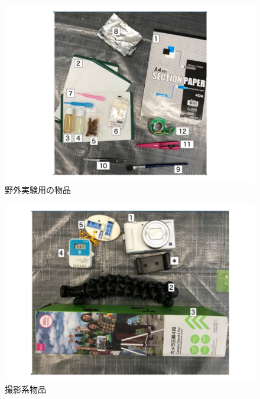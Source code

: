 ﻿\documentclass[a4paper, 12pt]{jsreport}
\begin{document}
\begin{figure}[tbp]
\centering
\includegraphics[width=13cm,  keepaspectratio]{exp1.pdf}
\caption[Short figure caption for List of Figures]{野外実験用の物品}
\label{fig:paper1_fig2}
\end{figure}
\begin{figure}[tbp]
\centering
\includegraphics[width=13cm,  keepaspectratio]{exp2.pdf}
\caption[Short figure caption for List of Figures]{撮影系物品}
\label{fig:paper1_fig3}
\end{figure}
\end{document}
